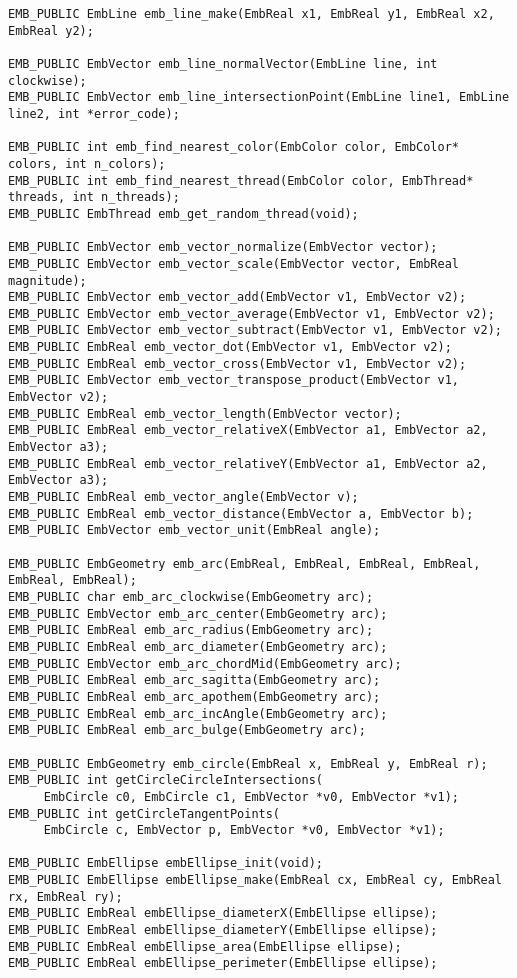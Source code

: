 \begin{verbatim}
EMB_PUBLIC EmbLine emb_line_make(EmbReal x1, EmbReal y1, EmbReal x2, EmbReal y2);

EMB_PUBLIC EmbVector emb_line_normalVector(EmbLine line, int clockwise);
EMB_PUBLIC EmbVector emb_line_intersectionPoint(EmbLine line1, EmbLine line2, int *error_code);

EMB_PUBLIC int emb_find_nearest_color(EmbColor color, EmbColor* colors, int n_colors);
EMB_PUBLIC int emb_find_nearest_thread(EmbColor color, EmbThread* threads, int n_threads);
EMB_PUBLIC EmbThread emb_get_random_thread(void);

EMB_PUBLIC EmbVector emb_vector_normalize(EmbVector vector);
EMB_PUBLIC EmbVector emb_vector_scale(EmbVector vector, EmbReal magnitude);
EMB_PUBLIC EmbVector emb_vector_add(EmbVector v1, EmbVector v2);
EMB_PUBLIC EmbVector emb_vector_average(EmbVector v1, EmbVector v2);
EMB_PUBLIC EmbVector emb_vector_subtract(EmbVector v1, EmbVector v2);
EMB_PUBLIC EmbReal emb_vector_dot(EmbVector v1, EmbVector v2);
EMB_PUBLIC EmbReal emb_vector_cross(EmbVector v1, EmbVector v2);
EMB_PUBLIC EmbVector emb_vector_transpose_product(EmbVector v1, EmbVector v2);
EMB_PUBLIC EmbReal emb_vector_length(EmbVector vector);
EMB_PUBLIC EmbReal emb_vector_relativeX(EmbVector a1, EmbVector a2, EmbVector a3);
EMB_PUBLIC EmbReal emb_vector_relativeY(EmbVector a1, EmbVector a2, EmbVector a3);
EMB_PUBLIC EmbReal emb_vector_angle(EmbVector v);
EMB_PUBLIC EmbReal emb_vector_distance(EmbVector a, EmbVector b);
EMB_PUBLIC EmbVector emb_vector_unit(EmbReal angle);

EMB_PUBLIC EmbGeometry emb_arc(EmbReal, EmbReal, EmbReal, EmbReal, EmbReal, EmbReal);
EMB_PUBLIC char emb_arc_clockwise(EmbGeometry arc);
EMB_PUBLIC EmbVector emb_arc_center(EmbGeometry arc);
EMB_PUBLIC EmbReal emb_arc_radius(EmbGeometry arc);
EMB_PUBLIC EmbReal emb_arc_diameter(EmbGeometry arc);
EMB_PUBLIC EmbVector emb_arc_chordMid(EmbGeometry arc);
EMB_PUBLIC EmbReal emb_arc_sagitta(EmbGeometry arc);
EMB_PUBLIC EmbReal emb_arc_apothem(EmbGeometry arc);
EMB_PUBLIC EmbReal emb_arc_incAngle(EmbGeometry arc);
EMB_PUBLIC EmbReal emb_arc_bulge(EmbGeometry arc);

EMB_PUBLIC EmbGeometry emb_circle(EmbReal x, EmbReal y, EmbReal r);
EMB_PUBLIC int getCircleCircleIntersections(
     EmbCircle c0, EmbCircle c1, EmbVector *v0, EmbVector *v1);
EMB_PUBLIC int getCircleTangentPoints(
     EmbCircle c, EmbVector p, EmbVector *v0, EmbVector *v1);

EMB_PUBLIC EmbEllipse embEllipse_init(void);
EMB_PUBLIC EmbEllipse embEllipse_make(EmbReal cx, EmbReal cy, EmbReal rx, EmbReal ry);
EMB_PUBLIC EmbReal embEllipse_diameterX(EmbEllipse ellipse);
EMB_PUBLIC EmbReal embEllipse_diameterY(EmbEllipse ellipse);
EMB_PUBLIC EmbReal embEllipse_area(EmbEllipse ellipse);
EMB_PUBLIC EmbReal embEllipse_perimeter(EmbEllipse ellipse);


\end{verbatim}
